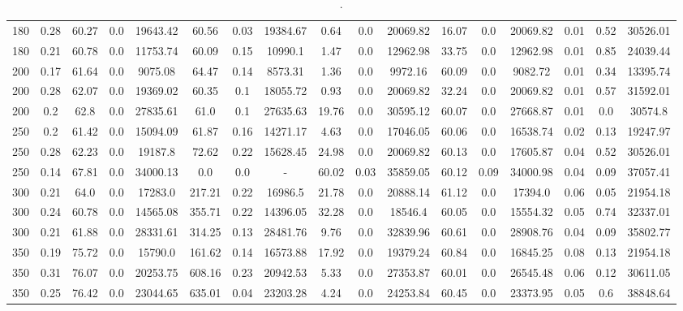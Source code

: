 \begin{sidewaystable}[!h]
{\begin{tabular}{lcccccccccccccccc}
180 & 0.28 & 60.27 & 0.0 & 19643.42 & 60.56 & 0.03 & 19384.67 & 0.64 & 0.0 & 20069.82 & 16.07 & 0.0 & 20069.82 & 0.01 & 0.52 & 30526.01 \\
180 & 0.21 & 60.78 & 0.0 & 11753.74 & 60.09 & 0.15 & 10990.1 & 1.47 & 0.0 & 12962.98 & 33.75 & 0.0 & 12962.98 & 0.01 & 0.85 & 24039.44 \\
200 & 0.17 & 61.64 & 0.0 & 9075.08 & 64.47 & 0.14 & 8573.31 & 1.36 & 0.0 & 9972.16 & 60.09 & 0.0 & 9082.72 & 0.01 & 0.34 & 13395.74 \\
200 & 0.28 & 62.07 & 0.0 & 19369.02 & 60.35 & 0.1 & 18055.72 & 0.93 & 0.0 & 20069.82 & 32.24 & 0.0 & 20069.82 & 0.01 & 0.57 & 31592.01 \\
200 & 0.2 & 62.8 & 0.0 & 27835.61 & 61.0 & 0.1 & 27635.63 & 19.76 & 0.0 & 30595.12 & 60.07 & 0.0 & 27668.87 & 0.01 & 0.0 & 30574.8 \\
250 & 0.2 & 61.42 & 0.0 & 15094.09 & 61.87 & 0.16 & 14271.17 & 4.63 & 0.0 & 17046.05 & 60.06 & 0.0 & 16538.74 & 0.02 & 0.13 & 19247.97 \\
250 & 0.28 & 62.23 & 0.0 & 19187.8 & 72.62 & 0.22 & 15628.45 & 24.98 & 0.0 & 20069.82 & 60.13 & 0.0 & 17605.87 & 0.04 & 0.52 & 30526.01 \\
250 & 0.14 & 67.81 & 0.0 & 34000.13 & 0.0 & 0.0 & - & 60.02 & 0.03 & 35859.05 & 60.12 & 0.09 & 34000.98 & 0.04 & 0.09 & 37057.41 \\
300 & 0.21 & 64.0 & 0.0 & 17283.0 & 217.21 & 0.22 & 16986.5 & 21.78 & 0.0 & 20888.14 & 61.12 & 0.0 & 17394.0 & 0.06 & 0.05 & 21954.18 \\
300 & 0.24 & 60.78 & 0.0 & 14565.08 & 355.71 & 0.22 & 14396.05 & 32.28 & 0.0 & 18546.4 & 60.05 & 0.0 & 15554.32 & 0.05 & 0.74 & 32337.01 \\
300 & 0.21 & 61.88 & 0.0 & 28331.61 & 314.25 & 0.13 & 28481.76 & 9.76 & 0.0 & 32839.96 & 60.61 & 0.0 & 28908.76 & 0.04 & 0.09 & 35802.77 \\
350 & 0.19 & 75.72 & 0.0 & 15790.0 & 161.62 & 0.14 & 16573.88 & 17.92 & 0.0 & 19379.24 & 60.84 & 0.0 & 16845.25 & 0.08 & 0.13 & 21954.18 \\
350 & 0.31 & 76.07 & 0.0 & 20253.75 & 608.16 & 0.23 & 20942.53 & 5.33 & 0.0 & 27353.87 & 60.01 & 0.0 & 26545.48 & 0.06 & 0.12 & 30611.05 \\
350 & 0.25 & 76.42 & 0.0 & 23044.65 & 635.01 & 0.04 & 23203.28 & 4.24 & 0.0 & 24253.84 & 60.45 & 0.0 & 23373.95 & 0.05 & 0.6 & 38848.64 \\
\bottomrule
\end{tabular}
}
\caption{.}
\label{tab:total}
\end{sidewaystable}
